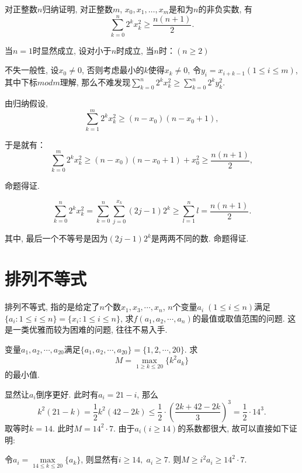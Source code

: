 \documentclass[lang=cn,12pt,thmcnt=section]{elegantbook}
\begin{document}
\begin{solution}
对正整数$n$归纳证明, 对正整数$m$, $x_0,x_1,\dots{},x_m$是和为$n$的非负实数, 有
\[
\sum_{k=0}^n 2^kx_k^2\ge \frac{n(n+1)}{2}.
\]

当$n=1$时显然成立, 设对小于$n$时成立, 当$n$时：$(n\ge 2)$

不失一般性, 设$x_0\ne 0$, 否则考虑最小的$k$使得$x_k\ne 0$, 令$y_i=x_{i+k-1}(1\le i\le m)$, 其中下标$mod m$理解, 那么不难发现$\sum\limits_{k=0}^n 2^kx_k^2\ge\sum\limits_{k=0}^n 2^ky_k^2 $.

由归纳假设, 
\[
\sum_{k=1}^m 2^kx_k^2\ge (n-x_0)(n-x_0+1),
\]

于是就有：
\[
\sum_{k=0}^m 2^kx_k^2\ge (n-x_0)(n-x_0+1)+x_0^2\ge \frac{n(n+1)}{2},
\]

命题得证.
\end{solution}

\begin{solution}
\[
\sum_{k=0}^n 2^kx_k^2=\sum_{k=0}^n  \sum_{j=0}^{x_k} (2j-1)2^k \ge \sum_{l=1}^n l=\frac{n(n+1)}{2}.
\]

其中, 最后一个不等号是因为$(2j-1)2^k$是两两不同的数. 命题得证.
\end{solution}



\section{排列不等式}
排列不等式, 指的是给定了$n$个数$x_1,x_3,\cdots,x_n$, $n$个变量$a_i\;(1\le i\le n)$满足$\{a_i:1\le i\le n\}=\{x_i:1\le i\le n\}$, 求$f(a_1,a_2,\cdots,a_n)$的最值或取值范围的问题. 这是一类优雅而较为困难的问题, 往往不易入手.

\begin{example}
变量$ a_{1},a_{2},\cdots,a_{20}$满足$\{a_{1},a_{2},\cdots,a_{20}\}=\{1,2,\cdots,20\}$. 求
\[M=\max_{1\geq k\le 20}\{k^{2}a_{k}\}\]
的最小值.
\end{example}

\begin{analysis}
显然让$a_i$倒序更好. 此时有$a_i=21-i$, 那么
\[k^{2}(21-k)=\frac{1}{2}k^{2}(42-2k)\leq\frac{1}{2}\cdot\left (\frac{2k+42-2k}{3}\right )^{3}=\frac{1}{2}\cdot14^{3}.\]
取等时$k=14$. 此时$M=14^2\cdot 7.$ 由于$a_i(i\ge 14)$的系数都很大, 故可以直接如下证明:
\end{analysis}

\begin{solution}
令$a_i=\max\limits_{14\leq k\leq20}\{a_{k}\}$, 则显然有$i\ge 14,\;a_i\ge 7$. 则$M\ge i^2 a_i\ge 14^2\cdot 7$.
\end{solution}
\end{document}
